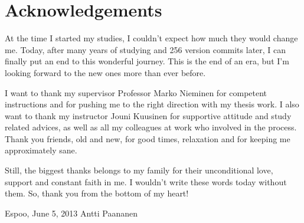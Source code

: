\documentclass[12pt,a4paper,oneside,pdftex]{report}
\newcommand{\DATE}{June 5, 2013}
\newcommand{\AUTHOR}{Antti Paananen}
\begin{document}




\chapter*{Acknowledgements}

At the time I started my studies, I couldn't expect how much they would change me.
Today, after many years of studying and 256 version commits later, I can finally put an end to this wonderful journey.
This is the end of an era, but I'm looking forward to the new ones more than ever before.

I want to thank my supervisor Professor Marko Nieminen for competent instructions and for pushing me to the right direction with my thesis work. 
I also want to thank my instructor Jouni Kuusinen for supportive attitude and study related advices, as well as all my colleagues at work who involved in the process.
Thank you friends, old and new, for good times, relaxation and for keeping me approximately sane.

Still, the biggest thanks belongs to my family for their unconditional love, support and constant faith in me. I wouldn't write these words today without them.
So, thank you from the bottom of my heart! 

\vskip 10mm

\noindent Espoo, \DATE
\vskip 5mm
\noindent\AUTHOR

\cleardoublepage
% 
\end{document}
